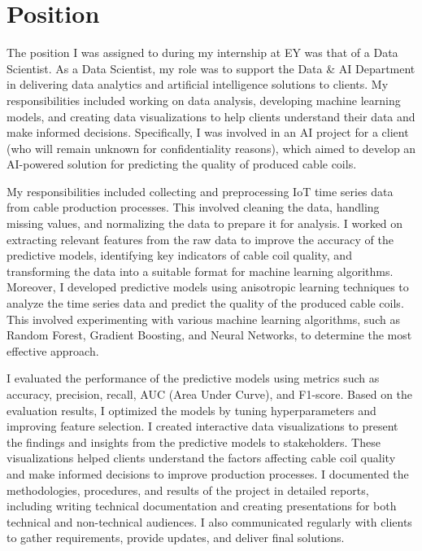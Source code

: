 \section{Position}

The position I was assigned to during my internship at EY was that of a Data
Scientist. As a Data Scientist, my role was to support the Data \& AI
Department in delivering data analytics and artificial intelligence solutions
to clients. My responsibilities included working on data analysis, developing
machine learning models, and creating data visualizations to help clients
understand their data and make informed decisions. Specifically, I was involved
in an AI project for a client (who will remain unknown for confidentiality
reasons), which aimed to develop an AI-powered solution for predicting the
quality of produced cable coils.

My responsibilities included collecting and preprocessing IoT time series data
from cable production processes. This involved cleaning the data, handling
missing values, and normalizing the data to prepare it for analysis. I worked
on extracting relevant features from the raw data to improve the accuracy of
the predictive models, identifying key indicators of cable coil quality, and
transforming the data into a suitable format for machine learning algorithms.
Moreover, I developed predictive models using anisotropic learning techniques
to analyze the time series data and predict the quality of the produced cable
coils. This involved experimenting with various machine learning algorithms,
such as Random Forest, Gradient Boosting, and Neural Networks, to determine the
most effective approach.

I evaluated the performance of the predictive models using metrics such as
accuracy, precision, recall, AUC (Area Under Curve), and F1-score. Based on the
evaluation results, I optimized the models by tuning hyperparameters and
improving feature selection. I created interactive data visualizations to
present the findings and insights from the predictive models to stakeholders.
These visualizations helped clients understand the factors affecting cable coil
quality and make informed decisions to improve production processes. I
documented the methodologies, procedures, and results of the project in
detailed reports, including writing technical documentation and creating
presentations for both technical and non-technical audiences. I also
communicated regularly with clients to gather requirements, provide updates,
and deliver final solutions.

